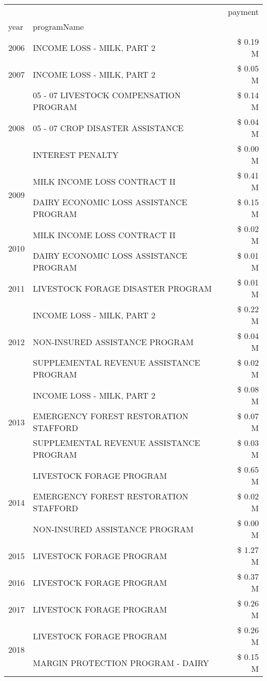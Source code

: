 \begin{tabular}{llr}
\toprule
 &  & payment \\
year & programName &  \\
\midrule
2006 & INCOME LOSS - MILK, PART 2 & \$ 0.19 M \\
\cline{1-3}
2007 & INCOME LOSS - MILK, PART 2 & \$ 0.05 M \\
\cline{1-3}
\multirow[t]{3}{*}{2008} & 05 - 07 LIVESTOCK COMPENSATION PROGRAM & \$ 0.14 M \\
 & 05 - 07 CROP DISASTER ASSISTANCE & \$ 0.04 M \\
 & INTEREST PENALTY & \$ 0.00 M \\
\cline{1-3}
\multirow[t]{2}{*}{2009} & MILK INCOME LOSS CONTRACT II & \$ 0.41 M \\
 & DAIRY ECONOMIC LOSS ASSISTANCE PROGRAM & \$ 0.15 M \\
\cline{1-3}
\multirow[t]{2}{*}{2010} & MILK INCOME LOSS CONTRACT II & \$ 0.02 M \\
 & DAIRY ECONOMIC LOSS ASSISTANCE PROGRAM & \$ 0.01 M \\
\cline{1-3}
2011 & LIVESTOCK FORAGE DISASTER PROGRAM & \$ 0.01 M \\
\cline{1-3}
\multirow[t]{3}{*}{2012} & INCOME LOSS - MILK, PART 2 & \$ 0.22 M \\
 & NON-INSURED ASSISTANCE PROGRAM & \$ 0.04 M \\
 & SUPPLEMENTAL REVENUE ASSISTANCE PROGRAM & \$ 0.02 M \\
\cline{1-3}
\multirow[t]{3}{*}{2013} & INCOME LOSS - MILK, PART 2 & \$ 0.08 M \\
 & EMERGENCY FOREST RESTORATION STAFFORD & \$ 0.07 M \\
 & SUPPLEMENTAL REVENUE ASSISTANCE PROGRAM & \$ 0.03 M \\
\cline{1-3}
\multirow[t]{3}{*}{2014} & LIVESTOCK FORAGE PROGRAM & \$ 0.65 M \\
 & EMERGENCY FOREST RESTORATION STAFFORD & \$ 0.02 M \\
 & NON-INSURED ASSISTANCE PROGRAM & \$ 0.00 M \\
\cline{1-3}
2015 & LIVESTOCK FORAGE PROGRAM & \$ 1.27 M \\
\cline{1-3}
2016 & LIVESTOCK FORAGE PROGRAM & \$ 0.37 M \\
\cline{1-3}
2017 & LIVESTOCK FORAGE PROGRAM & \$ 0.26 M \\
\cline{1-3}
\multirow[t]{3}{*}{2018} & LIVESTOCK FORAGE PROGRAM & \$ 0.26 M \\
 & MARGIN PROTECTION PROGRAM - DAIRY & \$ 0.15 M \\

\end{tabular}
